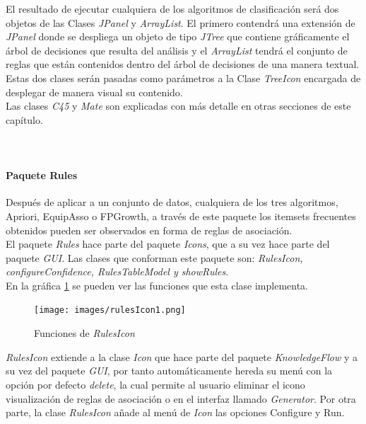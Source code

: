 El resultado de ejecutar cualquiera de los algoritmos de clasificaci\'on ser\'a dos objetos de las Clases
\textit{JPanel} y \textit{ArrayList}.  El primero contendr\'a una extensi\'on de \textit{JPanel} donde se
despliega un objeto de tipo \textit{JTree} que contiene gr\'aficamente el \'arbol de decisiones que resulta del
an\'alisis y el \textit{ArrayList} tendr\'a el conjunto de reglas que est\'an contenidos dentro del \'arbol de
decisiones de una manera textual.  Estas dos clases ser\'an pasadas como par\'ametros a la Clase \textit{TreeIcon}
encargada de desplegar de manera visual su contenido.\\

Las clases \textit{C45} y \textit{Mate} son explicadas con m\'as detalle en otras secciones de este cap\'itulo.\\
\\ \\
\paragraph{Paquete Rules}
Despu\'es de aplicar a un conjunto de datos, cualquiera de los tres algoritmos, Apriori, EquipAsso o FPGrowth, a
trav\'es de este paquete los itemsets frecuentes obtenidos pueden ser observados en forma de reglas de
asociaci\'on.\\

El paquete \textit{Rules} hace parte del paquete \textit{Icons}, que a su vez hace parte del paquete \textit{GUI}.
Las clases que conforman este paquete son: \textit{RulesIcon, configureConfidence, RulesTableModel y showRules}.\\

En la gr\'afica \ref{rulesIcon1} se pueden ver las funciones que esta clase implementa.\\

\begin{figure}[t]
\centering
\texttt{[image: images/rulesIcon1.png]}
\caption{Funciones de \textit{RulesIcon}}
\label{rulesIcon1}
\end{figure}

\textit{RulesIcon} extiende a la clase \textit{Icon} que hace parte del paquete \textit{KnowledgeFlow} y a su vez
del paquete \textit{GUI}, por tanto autom\'aticamente hereda su men\'u con la opci\'on por defecto
\textit{delete}, la cual permite al usuario eliminar el icono visualizaci\'on de reglas de asociaci\'on o en el
interfaz llamado  \textit{Generator}. Por otra parte, la clase \textit{RulesIcon} a\~nade al men\'u de
\textit{Icon} las opciones Configure y Run.\\

